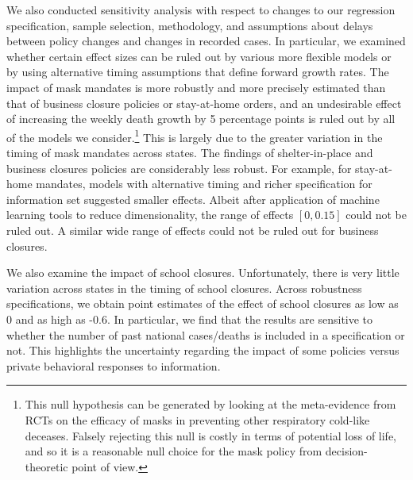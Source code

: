\documentclass[11pt,reqno,letter]{amsart}
\theoremstyle{definition}
\begin{document}
We also conducted sensitivity analysis with respect to changes to our regression specification, sample selection, methodology, and assumptions about delays between policy changes and changes in recorded cases. In particular, we examined whether certain effect
sizes can be ruled out by various more flexible models or by using alternative timing assumptions
that define forward growth rates. The impact of mask mandates is more robustly and more precisely estimated than that of business closure policies or stay-at-home orders, and an undesirable effect of increasing the weekly death growth by 5 percentage points is ruled out by all of the  models we consider.\footnote{This null
hypothesis can be generated by looking at the meta-evidence from RCTs on the efficacy of masks in preventing other respiratory
cold-like deceases. Falsely rejecting this null is   costly in terms of potential loss of life, and so it is a reasonable null choice 
for the mask policy from decision-theoretic point of view.} This is largely due to the greater variation in the timing of mask mandates across states. The findings of shelter-in-place and business closures policies are considerably less robust. For example, for stay-at-home mandates, models with alternative timing and richer specification for information set suggested smaller effects. Albeit
after application of machine learning tools to reduce dimensionality, the range of effects $[0,0.15]$ could not be ruled out.  A similar
wide range of effects could  not be ruled out for business closures.
  
We also examine the impact of school closures. Unfortunately, there is
very little variation across states in the timing of
school closures.  Across robustness specifications, we obtain point
estimates of the effect of school closures as low as 0 and as high as
-0.6. In particular, we find that the results are sensitive to whether
the number of past national cases/deaths is included in a
specification or not. This highlights the uncertainty regarding the
impact of some policies versus private behavioral responses to
information. %
\end{document}
